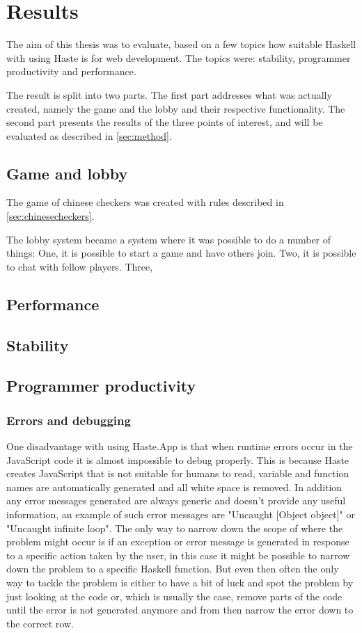 \documentclass[a4paper]{article}
\begin{document}
\section{Results}
The aim of this thesis was to evaluate, based on a few topics how suitable Haskell with using Haste is for web development. 
The topics were: stability, programmer productivity and performance. 

The result is split into two parts. The first part addresses what was actually created, namely the game and the lobby and their respective functionality. The second part presents the results of the three points of interest, and will be evaluated as described in \cref{sec:method}.

\subsection{Game and lobby}
The game of chinese checkers was created with rules described in \cref{sec:chinesecheckers}.

The lobby system became a system where it was possible to do a number of things: One, it is possible to start a game and have others join. Two, it is possible to chat with fellow players. Three, 

\subsection{Performance}

\subsection{Stability}
\subsection{Programmer productivity}
\subsubsection{Errors and debugging} 
One disadvantage with using Haste.App is that when runtime errors occur in the JavaScript code it is almost impossible to debug properly. This is because Haste creates JavaScript that is not suitable for humans to read, variable and function names are automatically generated and all white space is removed. In addition any error messages generated are always generic and doesn't provide any useful information, an example of such error messages are "Uncaught [Object object]" or "Uncaught infinite loop". The only way to narrow down the scope of where the problem might occur is if an exception or error message is generated in response to a specific action taken by the user, in this case it might be possible to narrow down the problem to a specific Haskell function. But even then often the only way to tackle the problem is either to have a bit of luck and spot the problem by just looking at the code or, which is usually the case, remove parts of the code until the error is not generated anymore and from then narrow the error down to the correct row.
\end{document}
